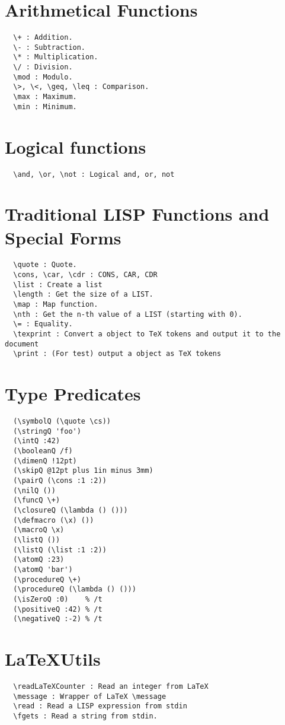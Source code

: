 \documentclass[a4paper,landscape,columns=3]{cheatsheet}
\begin{document}
\section{Arithmetical Functions}
\begin{lstlisting}
  \+ : Addition.
  \- : Subtraction.
  \* : Multiplication.
  \/ : Division.
  \mod : Modulo.
  \>, \<, \geq, \leq : Comparison.
  \max : Maximum.
  \min : Minimum.
\end{lstlisting}
%
%
\section{Logical functions}
\begin{lstlisting}
  \and, \or, \not : Logical and, or, not 
\end{lstlisting}
%
%
\section{Traditional LISP Functions and Special Forms}
\begin{lstlisting}
  \quote : Quote.
  \cons, \car, \cdr : CONS, CAR, CDR
  \list : Create a list
  \length : Get the size of a LIST.
  \map : Map function.
  \nth : Get the n-th value of a LIST (starting with 0).
  \= : Equality.
  \texprint : Convert a object to TeX tokens and output it to the document
  \print : (For test) output a object as TeX tokens
\end{lstlisting}
%
%
\section{Type Predicates}
\begin{lstlisting}
  (\symbolQ (\quote \cs))
  (\stringQ 'foo')
  (\intQ :42)
  (\booleanQ /f)
  (\dimenQ !12pt)
  (\skipQ @12pt plus 1in minus 3mm)
  (\pairQ (\cons :1 :2))
  (\nilQ ())
  (\funcQ \+)
  (\closureQ (\lambda () ()))
  (\defmacro (\x) ())
  (\macroQ \x)
  (\listQ ())
  (\listQ (\list :1 :2))
  (\atomQ :23)
  (\atomQ 'bar')
  (\procedureQ \+)
  (\procedureQ (\lambda () ()))
  (\isZeroQ :0)    % /t
  (\positiveQ :42) % /t
  (\negativeQ :-2) % /t
\end{lstlisting}
%
%
\section{\LaTeX Utils}
\begin{lstlisting}
  \readLaTeXCounter : Read an integer from LaTeX
  \message : Wrapper of LaTeX \message
  \read : Read a LISP expression from stdin
  \fgets : Read a string from stdin.
\end{lstlisting}
\end{document}
